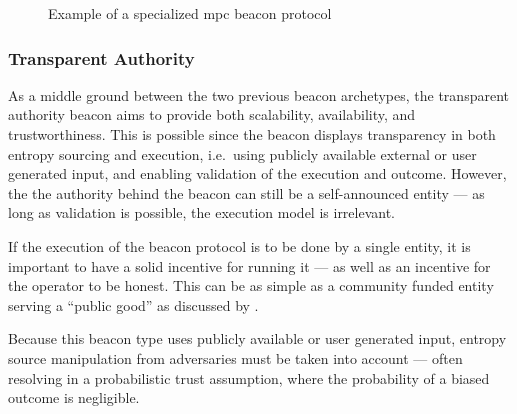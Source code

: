 \begin{figure}[htb]
    \centering
    \footnotesize
    \caption{Example of a specialized \gls{mpc} beacon protocol}\label{fig:mpc_beacon}
\end{figure}


\subsubsection{Transparent Authority}\label{ssub:transparent_authority}
As a middle ground between the two previous beacon archetypes, the transparent authority beacon aims to provide both scalability, availability, and trustworthiness.
This is possible since the beacon displays transparency in both entropy sourcing and execution, i.e.\ using publicly available external or user generated input, and enabling validation of the execution and outcome.
However, the the authority behind the beacon can still be a self-announced entity --- as long as validation is possible, the execution model is irrelevant.

If the execution of the beacon protocol is to be done by a single entity, it is important to have a solid incentive for running it --- as well as an incentive for the operator to be honest.
This can be as simple as a community funded entity serving a \enquote{public good} as discussed by \citet{bunz2017proofsof}.

Because this beacon type uses publicly available or user generated input, entropy source manipulation from adversaries must be taken into account --- often resolving in a probabilistic trust assumption, where the probability of a biased outcome is negligible.

